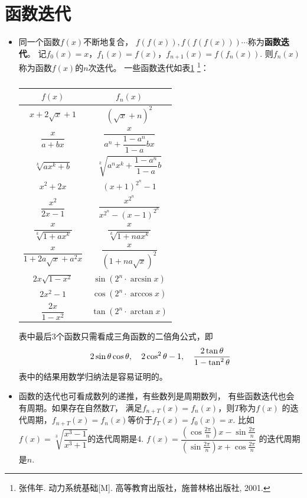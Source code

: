 \section{函数迭代}
\begin{itemize}[leftmargin=\inteval{\myitemleftmargin}pt,itemsep=
   \inteval{\myitemitempsep}pt,topsep=\inteval{\myitemtopsep}pt]
\item 同一个函数$ f(x) $不断地复合，
$ f(f(x)),f(f(f(x))) \cdots $称为\textbf{函数迭代}。
记$ f_0(x)=x $，$ f_1(x)=f(x) $，$ f_{n+1}(x)=f(f_n(x)) $. 
则$ f_n(x) $称为函数$ f(x) $的$ n $次迭代。
一些函数迭代如表\ref{函数迭代列表}
\footnote{张伟年. 动力系统基础[M]. 高等教育出版社，施普林格出版社, 2001.}：
\begin{table}[h] 
\centering
\renewcommand\arraystretch{1.5}  
\caption{}   
\begin{tabular}{|c|c|} 
    \hline
    $ f(x) $ & $ f_n(x) $ \\
    \hline
    $ x+2\sqrt{x}+1 $ & $ (\sqrt{x}+n)^2 $ \\
    \hline
    $ \dfrac{x}{a+bx} $ & $ \dfrac{x}{a^n+\dfrac{1-a^n}{1-a}bx} $ \\
    \hline
    $ \sqrt[k]{ax^k+b} $ & $ \sqrt[k]{a^nx^k+\dfrac{1-a^n}{1-a}b} $ \\
    \hline
    $ x^2+2x $ & $ (x+1)^{2^n}-1 $ \\
    \hline
    $ \dfrac{x^2}{2x-1} $ & $\dfrac{x^{2^n}}{x^{2^n}-(x-1)^{2^n}}$ \\
    \hline
    $ \dfrac{x}{\sqrt[k]{1+ax^k}} $ & $ \dfrac{x}{\sqrt[k]{1+nax^k}}  $ \\
    \hline
    $ \dfrac{x}{1+2a\sqrt{x}+a^2x} $ & $ \dfrac{x}{(1+na\sqrt{x})^2} $ \\
    \hline
    $ 2x\sqrt{1-x^2} $ & $ \sin(2^n\cdot \arcsin x) $ \\
    \hline
    $ 2x^2-1 $ & $ \cos(2^n\cdot \arccos x) $ \\
    \hline
    $ \dfrac{2x}{1-x^2} $ & $ \tan(2^n\cdot \arctan x) $ \\
    \hline
\end{tabular}
\label{函数迭代列表}
\end{table} 

表中最后3个函数只需看成三角函数的二倍角公式，即
\begin{gather*}
    2\sin \theta\cos \theta,\quad  2\cos^2 \theta-1,\quad 
    \dfrac{2\tan \theta}{1-\tan^2 \theta}
\end{gather*}
表中的结果用数学归纳法是容易证明的。

\item 函数的迭代也可看成数列的递推，有些数列是周期数列，
有些函数迭代也会有周期。如果存在自然数$ T $，
满足$ f_{n+T}(x)=f_n(x) $，则$ T $称为$ f(x) $
的迭代周期，$ f_{n+T}(x)=f_n(x) $等价于$ f_T(x)=f_0(x)=x $. 
比如$ f(x)=\sqrt[3]{\dfrac{x^3-1}{x^3+1}} $的迭代周期是4.
$ f(x)=\dfrac{\left(\cos \frac{2\pi}{n}\right)x-\sin \frac{2\pi}{n}}
{\left(\sin\frac{2\pi}{n}\right)x+\cos \frac{2\pi}{n}} $
的迭代周期是$ n $. 


\end{itemize}

